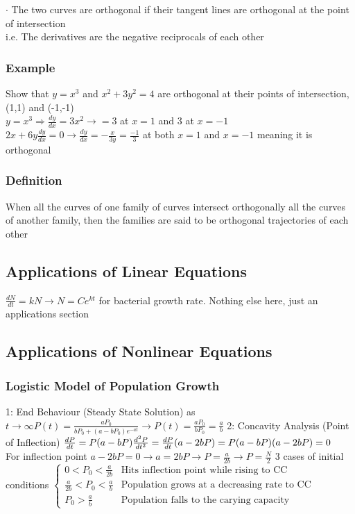 \documentclass{article}
\begin{document}
\textbf{$\cdot$} The two curves are orthogonal if their tangent lines are orthogonal at the point of intersection
\\i.e. The derivatives are the negative reciprocals of each other
\subsubsection{Example}
Show that $y=x^3$ and $x^2+3y^2=4$ are orthogonal at their points of intersection, (1,1) and (-1,-1)
\\ $y=x^3 \Rightarrow \frac{dy}{dx}=3x^2 \rightarrow =3$ at $x=1$ and 3 at $x=-1$
\\$2x+6y\frac{dy}{dx}=0 \rightarrow \frac{dy}{dx}=-\frac{x}{3y} = \frac{-1}{3}$ at both $x=1$ and $x=-1$ meaning it is orthogonal
\subsubsection{Definition} When all the curves of one family of curves intersect orthogonally all the curves of another family, then the families are said to be orthogonal trajectories of each other
\subsection{Applications of Linear Equations}
$\frac{dN}{dt}=kN\rightarrow N=Ce^{kt}$ for bacterial growth rate. Nothing else here, just an applications section
\subsection{Applications of Nonlinear Equations}
\subsubsection*{Logistic Model of Population Growth}
1: End Behaviour (Steady State Solution)
as $t\rightarrow \infty P(t)=\frac{aP_0}{bP_0+(a-bP_0)e^{-at}} \rightarrow P(t)=\frac{aP_0}{bP_0}=\frac{a}{b}$
2: Concavity Analysis (Point of Inflection)
$\frac{dP}{dt}=P(a-bP)\\\frac{d^2P}{dt^2}=\frac{dP}{dt}(a-2bP)=P(a-bP)(a-2bP)=0$ \\ For inflection point $a-2bP=0\rightarrow a=2bP \rightarrow P=\frac{a}{2b} \rightarrow P=\frac{N}{2}$
3 cases of initial conditions
$\begin{cases}
    0<P_0<\frac{a}{2b} & \text{Hits inflection point while rising to CC}\\
    \frac{a}{2b}<P_0<\frac{a}{b} & \text{Population grows at a decreasing rate to CC}\\
    P_0>\frac{a}{b} & \text{Population falls to the carying capacity}
\end{cases}$
\end{document}
